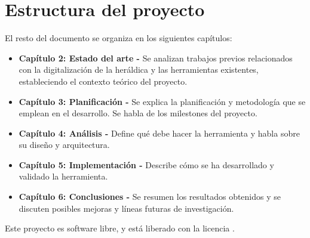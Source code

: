 \section{Estructura del proyecto}
El resto del documento se organiza en los siguientes capítulos:

\begin{itemize}
    \item \textbf{Capítulo 2: Estado del arte - }Se analizan trabajos previos relacionados
    con la digitalización de la heráldica y las herramientas existentes, estableciendo
    el contexto teórico del proyecto.
    \item \textbf{Capítulo 3: Planificación - }Se explica la planificación y metodología
    que se emplean en el desarrollo. Se habla de los milestones del proyecto.
    \item \textbf{Capítulo 4: Análisis - }Define qué debe hacer la herramienta y habla
    sobre su diseño y arquitectura.
    \item \textbf{Capítulo 5: Implementación - }Describe cómo se ha desarrollado y validado
    la herramienta. 
    \item \textbf{Capítulo 6: Conclusiones - }Se resumen los resultados obtenidos y se
    discuten posibles mejoras y líneas futuras de investigación.
\end{itemize}

Este proyecto es software libre, y está liberado con la licencia \cite{gplv3}.